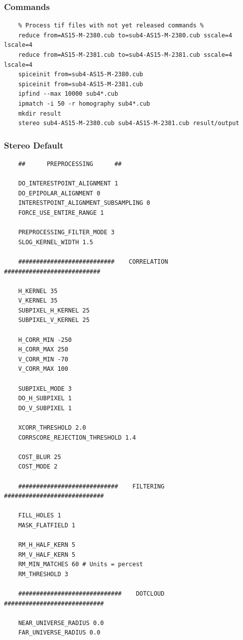 \subsubsection*{Commands}

\begin{verbatim}
    % Process tif files with not yet released commands %
    reduce from=AS15-M-2380.cub to=sub4-AS15-M-2380.cub sscale=4 lscale=4
    reduce from=AS15-M-2381.cub to=sub4-AS15-M-2381.cub sscale=4 lscale=4
    spiceinit from=sub4-AS15-M-2380.cub
    spiceinit from=sub4-AS15-M-2381.cub
    ipfind --max 10000 sub4*.cub
    ipmatch -i 50 -r homography sub4*.cub
    mkdir result
    stereo sub4-AS15-M-2380.cub sub4-AS15-M-2381.cub result/output
\end{verbatim}

\subsubsection*{Stereo Default}

\begin{verbatim}
    ##      PREPROCESSING      ##

    DO_INTERESTPOINT_ALIGNMENT 1
    DO_EPIPOLAR_ALIGNMENT 0
    INTERESTPOINT_ALIGNMENT_SUBSAMPLING 0
    FORCE_USE_ENTIRE_RANGE 1

    PREPROCESSING_FILTER_MODE 3
    SLOG_KERNEL_WIDTH 1.5

    ###########################    CORRELATION    ###########################

    H_KERNEL 35
    V_KERNEL 35
    SUBPIXEL_H_KERNEL 25
    SUBPIXEL_V_KERNEL 25

    H_CORR_MIN -250
    H_CORR_MAX 250
    V_CORR_MIN -70
    V_CORR_MAX 100

    SUBPIXEL_MODE 3
    DO_H_SUBPIXEL 1
    DO_V_SUBPIXEL 1

    XCORR_THRESHOLD 2.0
    CORRSCORE_REJECTION_THRESHOLD 1.4

    COST_BLUR 25
    COST_MODE 2

    ############################    FILTERING    ############################

    FILL_HOLES 1
    MASK_FLATFIELD 1

    RM_H_HALF_KERN 5
    RM_V_HALF_KERN 5
    RM_MIN_MATCHES 60 # Units = percest
    RM_THRESHOLD 3

    #############################    DOTCLOUD    ############################

    NEAR_UNIVERSE_RADIUS 0.0
    FAR_UNIVERSE_RADIUS 0.0

\end{verbatim}

